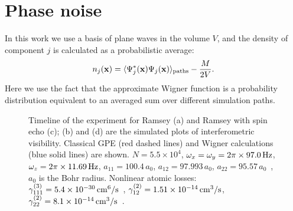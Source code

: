 \section{Phase noise}

In this work we use a basis of plane waves in the volume $V$,
and the density of component $j$ is calculated as a probabilistic average:
\begin{equation}
\label{eqn:wigner-density}
    n_j (\mathbf{x})
        = \langle \Psi^*_j (\mathbf{x}) \Psi_j (\mathbf{x}) \rangle_{\mathrm{paths}} - \frac{M}{2V}.
\end{equation}
Here we use the fact that the approximate Wigner function is a probability distribution
equivalent to an averaged sum over different simulation paths.

\begin{figure}

    \caption{
    Timeline of the experiment for Ramsey (a) and Ramsey with spin echo (c); (b) and (d) are the simulated plots of interferometric visibility.
    Classical GPE (red dashed lines) and Wigner calculations (blue solid lines) are shown.
    $N = 5.5 \times 10^4$,
    $\omega_x = \omega_y = 2 \pi \times 97.0\mbox{\ensuremath{\,\mathrm{Hz}}}$,
    $\omega_z = 2 \pi \times 11.69\mbox{\ensuremath{\,\mathrm{Hz}}}$,
    $a_{11} = 100.4\,a_0$, $a_{12} = 97.993\,a_0$, $a_{22} = 95.57\,a_0$~\cite{Egorov2011},
    $a_0$ is the Bohr radius.
    Nonlinear atomic losses:
    $\gamma^{(3)}_{111} = 5.4 \times 10^{-30}\mbox{\ensuremath{\,\mathrm{cm^6/s}}}$~\cite{Mertes2007},
    $\gamma^{(2)}_{12} = 1.51 \times 10^{-14}\mbox{\ensuremath{\,\mathrm{cm^3/s}}}$,
    $\gamma^{(2)}_{22} = 8.1 \times 10^{-14}\mbox{\ensuremath{\,\mathrm{cm^3/s}}}$~\cite{Egorov2011}.}

    \label{fig:visibility}
\end{figure}

